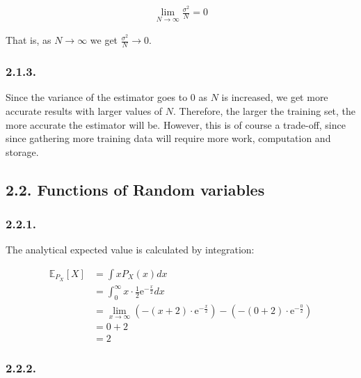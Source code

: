 \documentclass[a4paper, 12pt]{article}
\begin{document}
\begin{align}
	\lim\limits_{N \to \infty} \frac{\sigma^2}{N} = 0
\end{align}

That is, as $N \to \infty$ we get $\frac{\sigma^2}{N} \to 0$.

\subsubsection{2.1.3.}


Since the variance of the estimator goes to $0$ as $N$ is increased, we get more accurate results with larger values of $N$. Therefore, the larger the training set, the more accurate the estimator will be. However, this is of course a trade-off, since since gathering more training data will require more work, computation and storage.



\subsection{2.2. Functions of Random variables}

\subsubsection{2.2.1.}


The analytical expected value is calculated by integration:

\begin{align}
	\mathbb{E}_{P_X}[X] &= \int x P_X(x) dx\\
	&= \int_{0}^{\infty} x \cdot \frac{1}{2} \text{e}^{-\frac{x}{2}} dx\\
	&= \lim\limits_{x \to \infty} \left( -(x + 2) \cdot \text{e}^{-\frac{x}{2}} \right) - \left(-(0 + 2) \cdot \text{e}^{-\frac{0}{2}}\right) \\
	&= 0 + 2\\
	&= 2
\end{align}

\subsubsection{2.2.2.}
\end{document}
